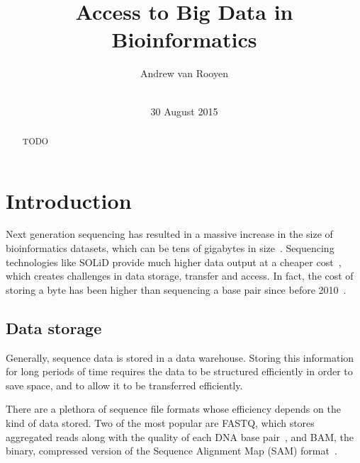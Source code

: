 \documentclass{sig-alternate-05-2015}
\begin{document}


\title{Access to Big Data in Bioinformatics}

\author{
\alignauthor
Andrew van Rooyen\\
       \\
}

\date{30 August 2015}


\maketitle
\begin{abstract}
	TODO
\end{abstract}


\section{Introduction}
Next generation sequencing has resulted in a massive increase in the size of bioinformatics datasets, which can be tens of gigabytes in size~\cite{deorowicz2011compression}. Sequencing technologies like SOLiD provide much higher data output at a cheaper cost~\cite{shendure2008next}, which creates challenges in data storage, transfer and access. In fact, the cost of storing a byte has been higher than sequencing a base pair since before 2010~\cite{baker2010next}.

\subsection{Data storage}
Generally, sequence data is stored in a data warehouse. Storing this information for long periods of time requires the data to be structured efficiently in order to save space, and to allow it to be transferred efficiently.

There are a plethora of sequence file formats whose efficiency depends on the kind of data stored. Two of the most popular are FASTQ, which stores aggregated reads along with the quality of each DNA base pair~\cite{cock2010sanger}, and BAM, the binary, compressed version of the Sequence Alignment Map (SAM) format~\cite{SAMspec}.
\end{document}
